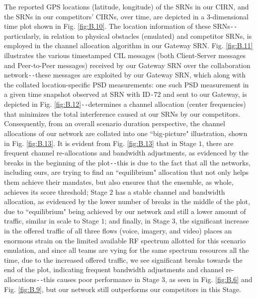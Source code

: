 The reported GPS locations (latitude, longitude) of the SRNs in our CIRN, and the SRNs in our competitors' CIRNs, over time, are depicted in a $3$-dimensional time plot shown in Fig. \ref{fig:B.10}. The location information of these SRNs\texttt{-{}-}particularly, in relation to physical obstacles (emulated) and competitor SRNs, is employed in the channel allocation algorithm in our Gateway SRN. Fig. \ref{fig:B.11} illustrates the various timestamped CIL messages (both Client-Server messages and Peer-to-Peer messages) received by our Gateway SRN over the collaboration network\texttt{-{}-}these messages are exploited by our Gateway SRN, which along with the collated location-specific PSD measurements: one such PSD measurement in a given time snapshot observed at SRN with ID\texttt{-}$72$ and sent to our Gateway, is depicted in Fig. \ref{fig:B.12}\texttt{-{}-}determines a channel allocation (center frequencies) that minimizes the total interference caused at our SRNs by our competitors. Consequently, from an overall scenario duration perspective, the channel allocations of our network are collated into one ``big-picture" illustration, shown in Fig. \ref{fig:B.13}. It is evident from Fig. \ref{fig:B.13} that in Stage $1$, there are frequent channel re-allocations and bandwidth adjustments, as evidenced by the breaks in the beginning of the plot\texttt{-{}-}this is due to the fact that all the networks, including ours, are trying to find an ``equilibrium" allocation that not only helps them achieve their mandates, but also ensures that the ensemble, as whole, achieves its score threshold; Stage $2$ has a stable channel and bandwidth allocation, as evidenced by the lower number of breaks in the middle of the plot, due to ``equilibrium" being achieved by our network and still a lower amount of traffic, similar in scale to Stage $1$; and finally, in Stage $3$, the significant increase in the offered traffic of all three flows (voice, imagery, and video) places an enormous strain on the limited available RF spectrum allotted for this scenario emulation, and since all teams are vying for the same spectrum resources all the time, due to the increased offered traffic, we see significant breaks towards the end of the plot, indicating frequent bandwidth adjustments and channel re-allocations\texttt{-{}-}this causes poor performance in Stage $3$, as seen in Fig. \ref{fig:B.6} and Fig. \ref{fig:B.9}, but our network still outperforms our competitors in this Stage.
